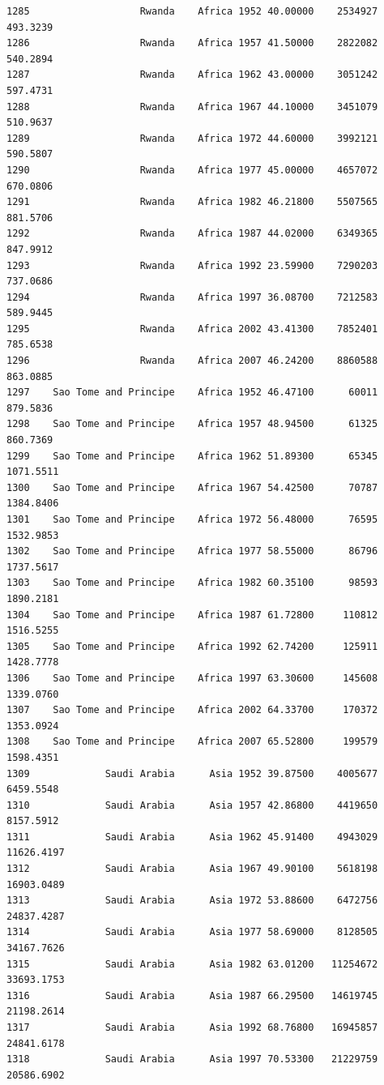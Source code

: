 \documentclass[
  letterpaper,
  DIV=11,
  numbers=noendperiod]{scrreprt}
\begin{document}
\begin{verbatim}
1285                   Rwanda    Africa 1952 40.00000    2534927    493.3239
1286                   Rwanda    Africa 1957 41.50000    2822082    540.2894
1287                   Rwanda    Africa 1962 43.00000    3051242    597.4731
1288                   Rwanda    Africa 1967 44.10000    3451079    510.9637
1289                   Rwanda    Africa 1972 44.60000    3992121    590.5807
1290                   Rwanda    Africa 1977 45.00000    4657072    670.0806
1291                   Rwanda    Africa 1982 46.21800    5507565    881.5706
1292                   Rwanda    Africa 1987 44.02000    6349365    847.9912
1293                   Rwanda    Africa 1992 23.59900    7290203    737.0686
1294                   Rwanda    Africa 1997 36.08700    7212583    589.9445
1295                   Rwanda    Africa 2002 43.41300    7852401    785.6538
1296                   Rwanda    Africa 2007 46.24200    8860588    863.0885
1297    Sao Tome and Principe    Africa 1952 46.47100      60011    879.5836
1298    Sao Tome and Principe    Africa 1957 48.94500      61325    860.7369
1299    Sao Tome and Principe    Africa 1962 51.89300      65345   1071.5511
1300    Sao Tome and Principe    Africa 1967 54.42500      70787   1384.8406
1301    Sao Tome and Principe    Africa 1972 56.48000      76595   1532.9853
1302    Sao Tome and Principe    Africa 1977 58.55000      86796   1737.5617
1303    Sao Tome and Principe    Africa 1982 60.35100      98593   1890.2181
1304    Sao Tome and Principe    Africa 1987 61.72800     110812   1516.5255
1305    Sao Tome and Principe    Africa 1992 62.74200     125911   1428.7778
1306    Sao Tome and Principe    Africa 1997 63.30600     145608   1339.0760
1307    Sao Tome and Principe    Africa 2002 64.33700     170372   1353.0924
1308    Sao Tome and Principe    Africa 2007 65.52800     199579   1598.4351
1309             Saudi Arabia      Asia 1952 39.87500    4005677   6459.5548
1310             Saudi Arabia      Asia 1957 42.86800    4419650   8157.5912
1311             Saudi Arabia      Asia 1962 45.91400    4943029  11626.4197
1312             Saudi Arabia      Asia 1967 49.90100    5618198  16903.0489
1313             Saudi Arabia      Asia 1972 53.88600    6472756  24837.4287
1314             Saudi Arabia      Asia 1977 58.69000    8128505  34167.7626
1315             Saudi Arabia      Asia 1982 63.01200   11254672  33693.1753
1316             Saudi Arabia      Asia 1987 66.29500   14619745  21198.2614
1317             Saudi Arabia      Asia 1992 68.76800   16945857  24841.6178
1318             Saudi Arabia      Asia 1997 70.53300   21229759  20586.6902

\end{verbatim}
\end{document}
